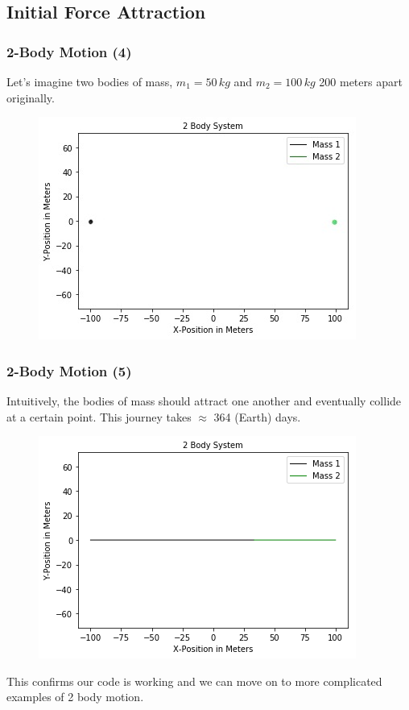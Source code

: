 \documentclass{beamer}
\begin{document}
\subsection{\tiny{Initial Force Attraction}}
\begin{frame}
\frametitle{2-Body Motion (4)}
Let's imagine two bodies of mass, $m_1=50 \hspace{2pt} kg$ and $m_2=100 \hspace{2pt} kg$ 200 meters apart originally.
\begin{figure}[htbp]
\begin{center}
\includegraphics[width=0.85\linewidth]{2Body1.png}
\end{center}
\end{figure}
\end{frame}
\begin{frame}
\frametitle{2-Body Motion (5)}
Intuitively, the bodies of mass should attract one another and eventually collide at a certain point. This journey takes $\approx$ 364 (Earth) days.
\begin{figure}[htbp]
\begin{center}
\includegraphics[width=0.70\linewidth]{2Body2.png}
\end{center}
\end{figure}
This confirms our code is working and we can move on to more complicated examples of 2 body motion.
\end{frame}
\end{document}
